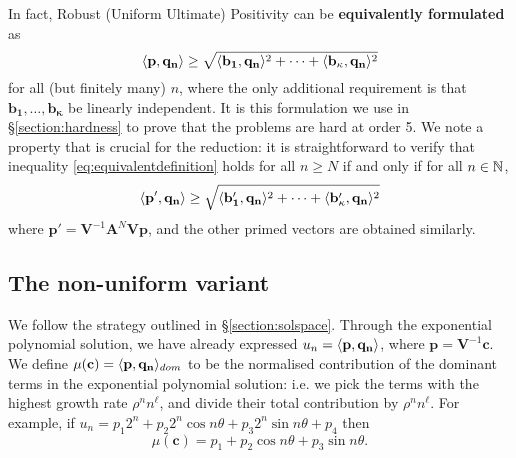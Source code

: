  In fact, Robust (Uniform Ultimate) Positivity can be \textbf{equivalently formulated} as
\begin{equation}
\label{eq:equivalentdefinition}
\langle\mathbf{p}, \mathbf{q_n}\rangle \ge \sqrt{\langle\mathbf{b_1}, \mathbf{q_n}\rangle^2 + \dots +\langle\mathbf{b_\kappa}, \mathbf{q_n}\rangle^2} 
\end{equation}
for all (but finitely many) $n$, where the only additional requirement is that $\mathbf{b_1}, \dots, \mathbf{b_\kappa}$ be linearly independent. It is this formulation we use in \S\ref{section:hardness} to prove that the problems are hard at order 5. We note a property that is crucial for the reduction: it is straightforward to verify that inequality \ref{eq:equivalentdefinition} holds for all $n \ge N$ if and only if for all $n \in \mathbb{N}$,
\begin{equation}
\langle\mathbf{p'}, \mathbf{q_n}\rangle \ge \sqrt{\langle\mathbf{b_1'}, \mathbf{q_n}\rangle^2 + \dots +\langle\mathbf{b_\kappa'}, \mathbf{q_n}\rangle^2} 
\end{equation}
where $\mathbf{p'} = \mathbf{V}^{-1}\mathbf{A}^N\mathbf{Vp}$, and the other primed vectors are obtained similarly.

\subsection{The non-uniform variant}
We follow the strategy outlined in \S\ref{section:solspace}. Through the exponential polynomial solution, we have already expressed $u_n = \langle\mathbf{p}, \mathbf{q_n}\rangle$, where $\mathbf{p} = \mathbf{V}^{-1}\mathbf{c}$. We define $\mu(\mathbf{c}) = \langle\mathbf{p}, \mathbf{q_n}\rangle_{dom}$ to be the normalised contribution of the dominant terms in the exponential polynomial solution: i.e. we pick the terms with the highest growth rate $\rho^n n^\ell$, and divide their total contribution by $\rho^n n^\ell$. For example, if
$
u_n = p_1 2^n + p_2 2^n\cos n\theta + p_3 2^n \sin n\theta + p_4
$
then $$\mu(\mathbf{c}) = p_1  + p_2 \cos n\theta + p_3 \sin n\theta.$$


